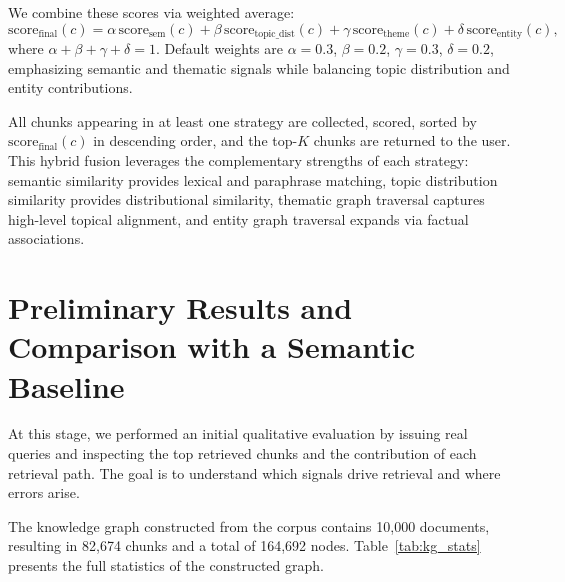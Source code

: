 \documentclass[10pt]{article}
\begin{document}
We combine these scores via weighted average:
\[
\text{score}_{\text{final}}(c) = \alpha \, \text{score}_{\text{sem}}(c) + \beta \, \text{score}_{\text{topic\_dist}}(c) + \gamma \, \text{score}_{\text{theme}}(c) + \delta \, \text{score}_{\text{entity}}(c),
\]
where $\alpha + \beta + \gamma + \delta = 1$. Default weights are $\alpha = 0.3$, $\beta = 0.2$, $\gamma = 0.3$, $\delta = 0.2$, emphasizing semantic and thematic signals while balancing topic distribution and entity contributions.

All chunks appearing in at least one strategy are collected, scored, sorted by $\text{score}_{\text{final}}(c)$ in descending order, and the top-$K$ chunks are returned to the user. This hybrid fusion leverages the complementary strengths of each strategy: semantic similarity provides lexical and paraphrase matching, topic distribution similarity provides distributional similarity, thematic graph traversal captures high-level topical alignment, and entity graph traversal expands via factual associations.

\section{Preliminary Results and Comparison with a Semantic Baseline}
\label{sec:results}

At this stage, we performed an initial qualitative evaluation by issuing real queries and inspecting the top retrieved chunks and the contribution of each retrieval path. The goal is to understand which signals drive retrieval and where errors arise.

The knowledge graph constructed from the corpus contains 10,000 documents, resulting in 82,674 chunks and a total of 164,692 nodes. Table~\ref{tab:kg_stats} presents the full statistics of the constructed graph.
\end{document}
